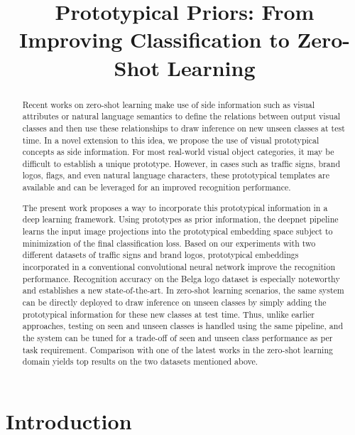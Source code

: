 \documentclass{bmvc2k}
\title{Prototypical Priors: From Improving Classification to Zero-Shot Learning}
\begin{document}
\maketitle

\begin{abstract}
Recent works on zero-shot learning make use of side information such
as visual attributes or natural language semantics to define the relations
between output visual classes and then use these relationships to draw inference
on new unseen classes at test time. In a novel extension to this idea,
we propose the use of visual prototypical concepts as side information. For
most real-world visual object categories, it may be difficult to establish
a unique prototype. However, in cases such as traffic signs, brand
logos, flags, and even natural language characters, these prototypical
templates are available and can be leveraged for an improved recognition
performance. 


The present work proposes a way to incorporate this prototypical information
in a deep learning framework. Using prototypes as prior information, the deepnet pipeline
learns the input image projections into the prototypical embedding space subject
to minimization of the final classification loss. Based on our
experiments with two different datasets of traffic signs and brand
logos, prototypical embeddings incorporated in a conventional convolutional neural network improve
the recognition performance. Recognition accuracy on the Belga logo dataset is
especially noteworthy and establishes a new state-of-the-art. In zero-shot
learning scenarios, the same system can be directly deployed to draw inference on unseen classes by simply adding the prototypical information 
for these new classes at test time. Thus, unlike earlier approaches, testing
on seen and unseen classes is handled using the same pipeline, and the system
can be tuned for a trade-off of seen and unseen class performance as per 
task requirement. Comparison with one of the latest works in the zero-shot
learning domain yields top results on the two datasets mentioned above.

\end{abstract}

\section{Introduction}
\end{document}
